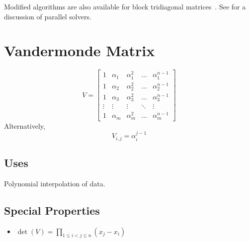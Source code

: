 Modified algorithms are also available for block tridiagonal matrices~\citep[]{Quateroni2007}. See \citep[]{Gallopoulos2016} for a discussion of parallel solvers.


\section{Vandermonde Matrix}
\begin{equation}
V=
\begin{bmatrix}
1      & \alpha_1 & \alpha_1^2 & \dots  & \alpha_1^{n-1} \\
1      & \alpha_2 & \alpha_2^2 & \dots  & \alpha_2^{n-1} \\
1      & \alpha_3 & \alpha_3^2 & \dots  & \alpha_3^{n-1} \\
\vdots & \vdots   & \vdots     & \ddots & \vdots         \\
1      & \alpha_m & \alpha_m^2 & \dots  & \alpha_m^{n-1}
\end{bmatrix}
\end{equation}
Alternatively,
\begin{equation}
V_{i,j} = \alpha_i^{j-1}
\end{equation}

\subsection*{Uses}
Polynomial interpolation of data.

\subsection*{Special Properties}
\begin{itemize}
\item $\det(V)=\prod_{1\le i < j \le n} (x_j-x_i)$
\end{itemize}